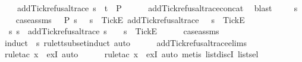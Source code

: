 \begin{isabellebody}
{\ \ \ \ add{\isacharunderscore}Tick{\isacharunderscore}refusal{\isacharunderscore}trace\ {\isacharparenleft}s\ {\isacharat}\ t{\isacharparenright}\ {\isasymin}\ P{\isachardoublequoteclose}\isanewline
\ \ \ \ \isamarkupfalse%
\ add{\isacharunderscore}Tick{\isacharunderscore}refusal{\isacharunderscore}trace{\isacharunderscore}concat\ \isamarkupfalse%
\ blast\isanewline
{}\isamarkupfalse%
\isanewline
\ \ \isamarkupfalse%
\ {\isasymrho}\ s\isanewline
\ \ \isamarkupfalse%
\ case{\isacharunderscore}assms{\isacharcolon}\ {\isachardoublequoteopen}{\isasymrho}\ {\isasymin}\ P{\isachardoublequoteclose}\ {\isachardoublequoteopen}{\isasymforall}s{\isachardot}\ {\isasymrho}\ {\isasymnoteq}\ s\ {\isacharat}\ {\isacharbrackleft}{\isacharbrackleft}Tick{\isacharbrackright}\isactrlsub E{\isacharbrackright}{\isachardoublequoteclose}\ {\isachardoublequoteopen}add{\isacharunderscore}Tick{\isacharunderscore}refusal{\isacharunderscore}trace\ {\isasymrho}\ {\isacharequal}\ s\ {\isacharat}\ {\isacharbrackleft}{\isacharbrackleft}Tick{\isacharbrackright}\isactrlsub E{\isacharbrackright}{\isachardoublequoteclose}\isanewline
\ \ \isamarkupfalse%
\ {\isachardoublequoteopen}{\isasymexists}\ s{\isacharprime}{\isachardot}\ s\ {\isacharequal}\ add{\isacharunderscore}Tick{\isacharunderscore}refusal{\isacharunderscore}trace\ s{\isacharprime}\ {\isasymand}\ {\isasymrho}\ {\isacharequal}\ s{\isacharprime}\ {\isacharat}\ {\isacharbrackleft}{\isacharbrackleft}Tick{\isacharbrackright}\isactrlsub E{\isacharbrackright}{\isachardoublequoteclose}\isanewline
\ \ \ \ \isamarkupfalse%
\ case{\isacharunderscore}assms{\isacharparenleft}{}{\isacharparenright}\ \isamarkupfalse%
\ {\isacharparenleft}induct\ {\isasymrho}\ s\ rule{\isacharcolon}tt{\isacharunderscore}subset{\isachardot}induct{\isacharcomma}\ auto{\isacharparenright}\isanewline
\ \ \ \ \isamarkupfalse%
\ add{\isacharunderscore}Tick{\isacharunderscore}refusal{\isacharunderscore}trace{\isachardot}elims\ \isamarkupfalse%
\ {\isacharparenleft}rule{\isacharunderscore}tac\ x{\isacharequal}{\isachardoublequoteopen}{\isacharbrackleft}{\isacharbrackright}{\isachardoublequoteclose}\ \ exI{\isacharcomma}\ auto{\isacharparenright}\isanewline
\ \ \ \ \isamarkupfalse%
\ {\isacharparenleft}rule{\isacharunderscore}tac\ x{\isacharequal}{\isachardoublequoteopen}{\isacharbrackleft}{\isacharbrackright}{\isachardoublequoteclose}\ \ exI{\isacharcomma}\ auto{\isacharcomma}\ metis\ list{\isachardot}discI\ list{\isachardot}sel{\isacharparenleft}{}{\isacharparenright}{\isacharparenright}\isanewline
}
\end{isabellebody}

